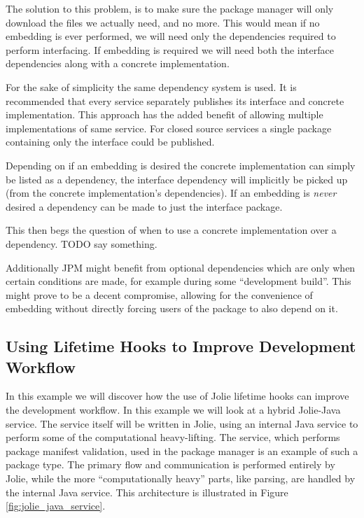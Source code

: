 The solution to this problem, is to make sure the package manager will only
download the files we actually need, and no more. This would mean if no
embedding is ever performed, we will need only the dependencies required to
perform interfacing. If embedding is required we will need both the interface
dependencies along with a concrete implementation.

For the sake of simplicity the same dependency system is used. It is
recommended that every service separately publishes its interface and concrete
implementation. This approach has the added benefit of allowing multiple
implementations of same service. For closed source services a single package
containing only the interface could be published.

Depending on if an embedding is desired the concrete implementation can simply
be listed as a dependency, the interface dependency will implicitly be picked
up (from the concrete implementation's dependencies). If an embedding is
\emph{never} desired a dependency can be made to just the interface package.

This then begs the question of when to use a concrete implementation over a
dependency. TODO say something.

Additionally JPM might benefit from optional dependencies which are only when
certain conditions are made, for example during some ``development build''.
This might prove to be a decent compromise, allowing for the convenience of
embedding without directly forcing users of the package to also depend on it.

\subsection{Using Lifetime Hooks to Improve Development Workflow}

In this example we will discover how the use of Jolie lifetime hooks can
improve the development workflow. In this example we will look at a hybrid
Jolie-Java service. The service itself will be written in Jolie, using an
internal Java service to perform some of the computational heavy-lifting.  The
 service, which performs package manifest validation, used in
the package manager is an example of such a package type. The primary flow and
communication is performed entirely by Jolie, while the more ``computationally
heavy'' parts, like parsing, are handled by the internal Java service.  This
architecture is illustrated in Figure \ref{fig:jolie_java_service}.

